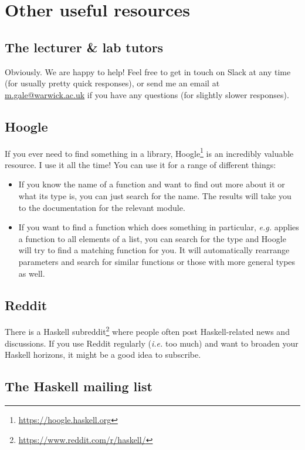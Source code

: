 \section{Other useful resources}
\label{sec:useful-resources}

\subsection{The lecturer \& lab tutors} 
\label{sec:getting-help}

Obviously. We are happy to help! Feel free to get in touch on Slack at any time (for usually pretty quick responses), or send me an email at \href{mailto:m.gale@warwick.ac.uk}{m.gale@warwick.ac.uk} if you have any questions (for slightly slower responses). 

\subsection{Hoogle} 

If you ever need to find something in a library, Hoogle\footnote{\url{https://hoogle.haskell.org}} is an incredibly valuable resource. I use it all the time! You can use it for a range of different things:
\begin{itemize}
\item If you know the name of a function and want to find out more about it or what its type is, you can just search for the name. The results will take you to the documentation for the relevant module.
\item If you want to find a function which does something in particular, \emph{e.g.} applies a function to all elements of a list, you can search for the type and Hoogle will try to find a matching function for you. It will automatically rearrange parameters and search for similar functions or those with more general types as well. 
\end{itemize}

\subsection{Reddit} 

There is a Haskell subreddit\footnote{\url{https://www.reddit.com/r/haskell/}} where people often post Haskell-related news and discussions. If you use Reddit regularly (\emph{i.e.} too much) and want to broaden your Haskell horizons, it might be a good idea to subscribe.

\subsection{The Haskell mailing list} 

